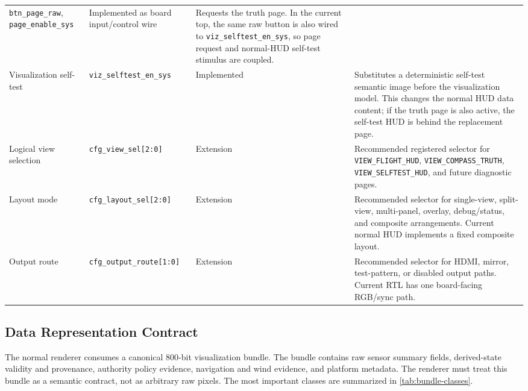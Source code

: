 \documentclass[letterpaper, final, onecolumn, titlepage]{article}
\newcommand{\cref}[1]{\ref{#1}}
\DeclareRobustCommand{\sig}[1]{\nolinkurl{#1}}
\DeclareRobustCommand{\view}[1]{\nolinkurl{#1}}
\begin{document}
\begin{longtable}{L{0.21\textwidth} L{0.24\textwidth} L{0.16\textwidth} L{0.30\textwidth}}
\sig{btn_page_raw}, \sig{page_enable_sys} &
Implemented as board input/control wire &
Requests the truth page. In the current top, the same raw button is also wired to \sig{viz_selftest_en_sys}, so page request and normal-HUD self-test stimulus are coupled. \\
\addlinespace
Visualization self-test &
\sig{viz_selftest_en_sys} &
Implemented &
Substitutes a deterministic self-test semantic image before the visualization model. This changes the normal HUD data content; if the truth page is also active, the self-test HUD is behind the replacement page. \\
\addlinespace
Logical view selection &
\sig{cfg_view_sel[2:0]} &
Extension &
Recommended registered selector for \view{VIEW_FLIGHT_HUD}, \view{VIEW_COMPASS_TRUTH}, \view{VIEW_SELFTEST_HUD}, and future diagnostic pages. \\
\addlinespace
Layout mode &
\sig{cfg_layout_sel[2:0]} &
Extension &
Recommended selector for single-view, split-view, multi-panel, overlay, debug/status, and composite arrangements. Current normal HUD implements a fixed composite layout. \\
\addlinespace
Output route &
\sig{cfg_output_route[1:0]} &
Extension &
Recommended selector for HDMI, mirror, test-pattern, or disabled output paths. Current RTL has one board-facing RGB/sync path. \\
\bottomrule
\end{longtable}

\subsection{Data Representation Contract}

The normal renderer consumes a canonical 800-bit visualization bundle. The bundle
contains raw sensor summary fields, derived-state validity and provenance,
authority policy evidence, navigation and wind evidence, and platform metadata.
The renderer must treat this bundle as a semantic contract, not as arbitrary raw
pixels. The most important classes are summarized in \cref{tab:bundle-classes}.
\end{document}
